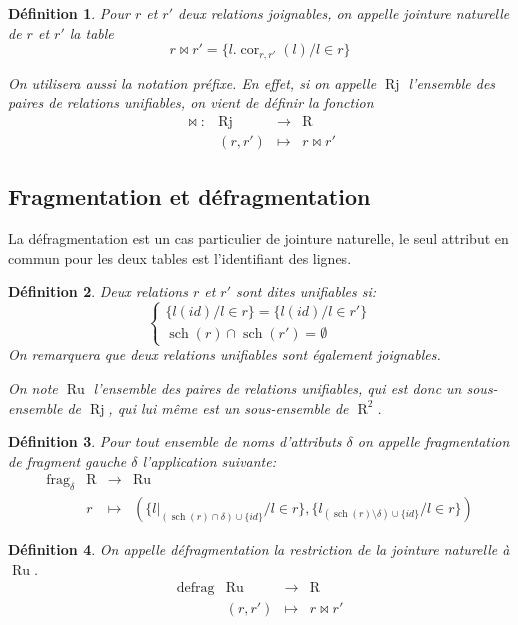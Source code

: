 \documentclass[french]{article}
\DeclareMathOperator{\frag}{frag}
\DeclareMathOperator{\defrag}{defrag}
\DeclareMathOperator{\R}{R}
\DeclareMathOperator{\s}{sch}
\DeclareMathOperator{\ru}{Ru}
\DeclareMathOperator{\cor}{cor}
\DeclareMathOperator{\rj}{Rj}
\newcommand{\fragDelta}{\frag_{\delta}}
\newtheorem{defi}{Définition}
\begin{document}
\begin{defi}
	Pour $r$ et $r'$ deux relations joignables,
	on appelle \emph{jointure naturelle}
	de $r$ et $r'$ la table
	$$
	r \Join r' = \{l.\cor_{r,r'}(l) / l \in r \}
	$$
	
	On utilisera aussi la notation préfixe.
	En effet, si on appelle $\rj$ l'ensemble
	des paires de relations unifiables,
	on vient de définir la fonction
	$$
	\begin{array}{llcl}
	\Join : & \rj & \rightarrow & \R \\
			& (r, r') & \mapsto & r \Join r'
	\end{array}
	$$
\end{defi}

\subsection*{Fragmentation et défragmentation}
La défragmentation est un cas particulier de jointure naturelle,
le seul attribut en commun pour les deux tables est l'identifiant des lignes.

\begin{defi}
	Deux relations $r$ et $r'$ sont dites \emph{unifiables}
	si:
	$$
	\left\lbrace
	\begin{array}{l}
	\{l(id) / l \in r \} = \{l(id) / l \in r' \} \\
	\s(r) \cap \s(r') = \emptyset
	\end{array}
	\right.
	$$
	On remarquera que deux relations unifiables sont également joignables.
	
	On note $\ru$ l'ensemble des paires de relations unifiables,
	qui est donc un sous-ensemble de $\rj$, qui lui même
	est un sous-ensemble de $\R^2$.
\end{defi}

\begin{defi}
	Pour tout ensemble de noms d'attributs $\delta$
	on appelle \emph{fragmentation de fragment gauche $\delta$}
	l'application suivante:
	$$
	\begin{array}{llcl}
	\fragDelta 	& \R & \rightarrow & \ru \\
				& r  & \mapsto & (\{l|_{(\s(r)\cap \delta) \cup \{id\}}/ l \in r \}, 
						\{ l_{(\s(r) \setminus \delta)\cup \{id\}} / l \in r \})
	\end{array}
	$$
\end{defi}

\begin{defi}
	On appelle \emph{défragmentation} la
	restriction de la jointure naturelle à $\ru$.
	$$
	\begin{array}{llcl}
	\defrag 	& \ru & \rightarrow & \R \\
	& (r, r')  & \mapsto & r \Join r'
	\end{array}
	$$
\end{defi}
\end{document}
